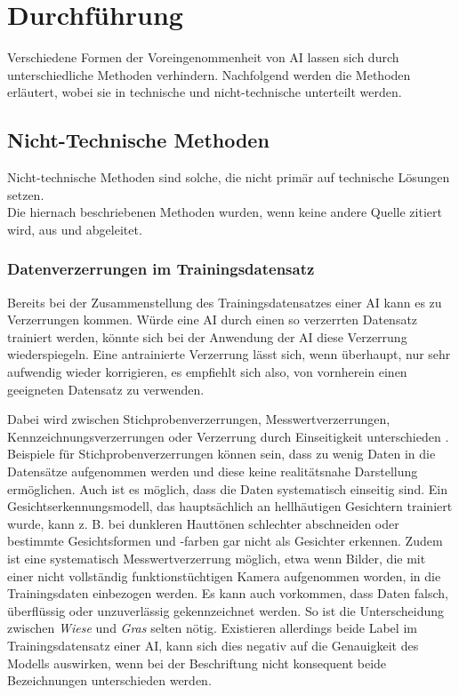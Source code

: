 \documentclass[12pt]{report}
\begin{document}
\chapter{Durchführung}\label{execution}
Verschiedene Formen der Voreingenommenheit von AI lassen sich durch unterschiedliche Methoden verhindern. Nachfolgend werden die Methoden erläutert, wobei sie in technische und nicht-technische unterteilt werden.

\section{Nicht-Technische Methoden}
Nicht-technische Methoden sind solche, die nicht primär auf technische Lösungen setzen.\\
Die hiernach beschriebenen Methoden wurden, wenn keine andere Quelle zitiert wird, aus \cite{UNESCO} und \cite{EUCommision} abgeleitet. %

\subsection{Datenverzerrungen im Trainingsdatensatz}
Bereits bei der Zusammenstellung des Trainingsdatensatzes einer AI kann es zu Verzerrungen kommen. Würde eine AI durch einen so verzerrten Datensatz trainiert werden, könnte sich bei der Anwendung der AI diese Verzerrung wiederspiegeln. Eine antrainierte Verzerrung lässt sich, wenn überhaupt, nur sehr aufwendig wieder korrigieren, es empfiehlt sich also, von vornherein einen geeigneten Datensatz zu verwenden.

Dabei wird zwischen Stichprobenverzerrungen, Messwertverzerrungen, Kennzeichnungsverzerrungen oder Verzerrung durch Einseitigkeit unterschieden \cite[S. 48ff.]{Srinivasan}.
Beispiele für Stichprobenverzerrungen können sein, dass zu wenig Daten in die Datensätze aufgenommen werden und diese keine realitätsnahe Darstellung ermöglichen.
Auch ist es möglich, dass die Daten systematisch einseitig sind. Ein Gesichtserkennungsmodell, das hauptsächlich an hellhäutigen Gesichtern trainiert wurde, kann z. B. bei dunkleren Hauttönen schlechter abschneiden oder bestimmte Gesichtsformen und -farben gar nicht als Gesichter erkennen.
Zudem ist eine systematisch Messwertverzerrung möglich, etwa wenn Bilder, die mit einer nicht vollständig funktionstüchtigen Kamera aufgenommen worden, in die Trainingsdaten einbezogen werden.
Es kann auch vorkommen, dass Daten falsch, überflüssig oder unzuverlässig gekennzeichnet werden. So ist die Unterscheidung zwischen \textit{Wiese} und \textit{Gras} selten nötig. Existieren allerdings beide Label im Trainingsdatensatz einer AI, kann sich dies negativ auf die Genauigkeit des Modells auswirken, wenn bei der Beschriftung nicht konsequent beide Bezeichnungen unterschieden werden\cite[S. 48ff.]{Srinivasan}. 
\end{document}
